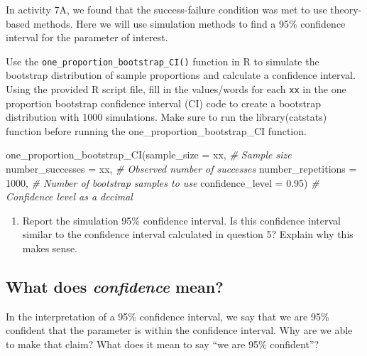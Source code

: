 \documentclass[
]{report}
\newenvironment{Shaded}{\begin{snugshade}}{\end{snugshade}}
\newcommand{\AttributeTok}[1]{\textcolor[rgb]{0.77,0.63,0.00}{#1}}
\newcommand{\CommentTok}[1]{\textcolor[rgb]{0.56,0.35,0.01}{\textit{#1}}}
\newcommand{\DecValTok}[1]{\textcolor[rgb]{0.00,0.00,0.81}{#1}}
\newcommand{\FloatTok}[1]{\textcolor[rgb]{0.00,0.00,0.81}{#1}}
\newcommand{\FunctionTok}[1]{\textcolor[rgb]{0.00,0.00,0.00}{#1}}
\newcommand{\NormalTok}[1]{#1}
\providecommand{\tightlist}{%
  \setlength{\itemsep}{0pt}\setlength{\parskip}{0pt}}
\begin{document}
In activity 7A, we found that the success-failure condition was met to use theory-based methods. Here we will use simulation methods to find a 95\% confidence interval for the parameter of interest.

Use the \texttt{one\_proportion\_bootstrap\_CI()} function in R to simulate the bootstrap distribution of sample proportions and calculate a confidence interval. Using the provided R script file, fill in the values/words for each \texttt{xx} in the one proportion bootstrap confidence interval (CI) code to create a bootstrap distribution with 1000 simulations. Make sure to run the library(catstats) function before running the one\_proportion\_bootstrap\_CI function.

\begin{Shaded}
\begin{Highlighting}[]
\FunctionTok{one\_proportion\_bootstrap\_CI}\NormalTok{(}\AttributeTok{sample\_size =}\NormalTok{ xx, }\CommentTok{\# Sample size}
                    \AttributeTok{number\_successes =}\NormalTok{ xx, }\CommentTok{\# Observed number of successes}
                    \AttributeTok{number\_repetitions =} \DecValTok{1000}\NormalTok{, }\CommentTok{\# Number of bootstrap samples to use}
                    \AttributeTok{confidence\_level =} \FloatTok{0.95}\NormalTok{) }\CommentTok{\# Confidence level as a decimal}
\end{Highlighting}
\end{Shaded}

\begin{enumerate}
\def\labelenumi{\arabic{enumi}.}
\setcounter{enumi}{7}
\tightlist
\item
  Report the simulation 95\% confidence interval. Is this confidence interval similar to the confidence interval calculated in question 5? Explain why this makes sense.
\end{enumerate}

\vspace{0.8in}

\hypertarget{what-does-confidence-mean}{%
\subsection*{\texorpdfstring{What does \emph{confidence} mean?}{What does confidence mean?}}\label{what-does-confidence-mean}}

In the interpretation of a 95\% confidence interval, we say that we are 95\% confident that the parameter is within the confidence interval. Why are we able to make that claim? What does it mean to say ``we are 95\% confident''?
\end{document}
